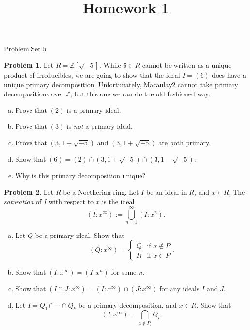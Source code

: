 \documentclass[11pt]{article}
\title{}
\date{\vspace{-0.5in}}
\title{Homework 1}
\theoremstyle{definition}
\newtheorem{problem}{Problem}
\begin{document}
\thispagestyle{fancy}
\pagestyle{fancy}


\begin{center}
	{\LARGE Problem Set 5}
\end{center}


\begin{problem}
	Let $R = \mathbb{Z}[\sqrt{-5}]$. While $6 \in R$ cannot be written as a unique product of irreducibles, we are going to show that the ideal $I = (6)$ does have a unique primary decomposition. Unfortunately, Macaulay2 cannot take primary decompositions over $\mathbb{Z}$, but this one we can do the old fashioned way.	
	\begin{enumerate}[a)]
	\item Prove that $(2)$ is a primary ideal.
	\item Prove that $(3)$ is \emph{not} a primary ideal.
	\item Prove that $(3, 1+\sqrt{-5})$ and $(3, 1+\sqrt{-5})$ are both primary.
	\item Show that $(6) = (2) \cap (3, 1+\sqrt{-5}) \cap (3, 1 -\sqrt{-5})$.
	\item Why is this primary decomposition unique?
	\end{enumerate}
\end{problem}


\begin{problem} Let $R$ be a Noetherian ring. Let $I$ be an ideal in $R$, and $x \in R$. The \emph{saturation} of $I$ with respect to $x$ is the ideal
$$(I : x^\infty) := \bigcup_{n=1}^\infty (I : x^n).$$
	\begin{enumerate}[a)]
	\item Let $Q$ be a primary ideal. Show that
	$$(Q : x^\infty) = \left\lbrace \begin{array}{ll} Q & \textrm{if } x \notin P \\ R & \textrm{if } x \in P \end{array}\right. .$$
	\item Show that $(I : x^\infty) = (I : x^n)$ for some $n$.
	\item Show that $(I \cap J : x^\infty) = (I : x^\infty) \cap (J : x^\infty)$ for any ideals $I$ and $J$.
	\item Let $I = Q_1 \cap \cdots \cap Q_k$ be a primary decomposition, and $x \in R$. Show that
	$$(I : x^\infty) = \bigcap_{x \notin P_i} Q_i.$$
	\end{enumerate}
\end{problem}
\end{document}
